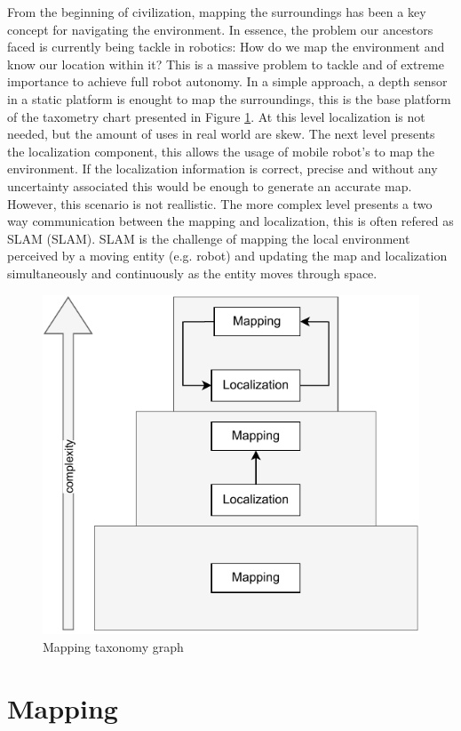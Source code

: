 From the beginning of civilization, mapping the surroundings has been a key concept for navigating the environment. In essence, the problem our ancestors faced is currently being tackle in robotics: How do we map the environment and know our location within it? This is a massive problem to tackle and of extreme importance to achieve full robot autonomy. In a simple approach, a depth sensor in a static platform is enought to map the surroundings, this is the base platform of the taxometry chart presented in Figure \ref*{fig: taxonomy graph}. At this level localization is not needed, but the amount of uses in real world are skew. The next level presents the localization component, this allows the usage of mobile robot's to map the environment. If the localization information is correct, precise and without any uncertainty associated this would be enough to generate an accurate map. However, this scenario is not reallistic. The more complex level presents a two way communication between the mapping and localization, this is often refered as \acl*{SLAM} (\acs*{SLAM}). \acs*{SLAM} is the challenge of mapping the local environment perceived by a moving entity (e.g. robot) and updating the map and localization simultaneously and continuously as the entity moves through space.

\begin{figure}[H]
    \centering
    \includegraphics[width=0.4\linewidth]{images/background/mapping taxo.pdf}
    \caption{Mapping taxonomy graph}
    \label{fig: taxonomy graph}
\end{figure}


\section{Mapping}

